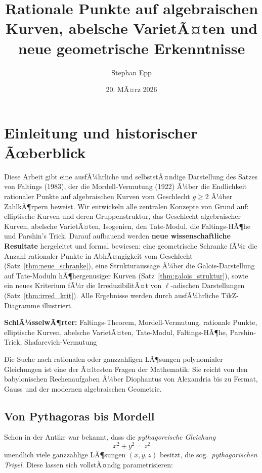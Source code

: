 ﻿\documentclass[12pt,a4paper]{article}
\title{Rationale Punkte auf algebraischen Kurven, abelsche VarietÃ¤ten und neue geometrische Erkenntnisse}
\author{Stephan Epp}
\date{20. MÃ¤rz 2026}
\theoremstyle{plain}
\theoremstyle{definition}
\theoremstyle{remark}
\begin{document}

\maketitle
\tableofcontents
\newpage

\section{Einleitung und historischer Ãœberblick}
Diese Arbeit gibt eine ausfÃ¼hrliche und selbststÃ¤ndige Darstellung des Satzes von Faltings (1983),
der die Mordell-Vermutung (1922) Ã¼ber die Endlichkeit rationaler Punkte auf algebraischen Kurven
vom Geschlecht $g \geq 2$ Ã¼ber ZahlkÃ¶rpern beweist.
Wir entwickeln alle zentralen Konzepte von Grund auf:
elliptische Kurven und deren Gruppenstruktur, das Geschlecht algebraischer Kurven,
abelsche VarietÃ¤ten, Isogenien, den Tate-Modul, die Faltings-HÃ¶he und Parshin's Trick.
Darauf aufbauend werden \textbf{neue wissenschaftliche Resultate} hergeleitet und formal bewiesen:
eine geometrische Schranke fÃ¼r die Anzahl rationaler Punkte in AbhÃ¤ngigkeit vom Geschlecht
(Satz~\ref{thm:neue_schranke}), eine Strukturaussage Ã¼ber die Galois-Darstellung auf Tate-Moduln
hÃ¶hergenusiger Kurven (Satz~\ref{thm:galois_struktur}), sowie ein neues Kriterium fÃ¼r die
IrreduzibilitÃ¤t von $\ell$-adischen Darstellungen (Satz~\ref{thm:irred_krit}).
Alle Ergebnisse werden durch ausfÃ¼hrliche TikZ-Diagramme illustriert.

\textbf{SchlÃ¼sselwÃ¶rter:} Faltings-Theorem, Mordell-Vermutung, rationale Punkte, elliptische Kurven,
abelsche VarietÃ¤ten, Tate-Modul, Faltings-HÃ¶he, Parshin-Trick, Shafarevich-Vermutung

Die Suche nach rationalen oder ganzzahligen LÃ¶sungen polynomialer Gleichungen ist eine der
Ã¤ltesten Fragen der Mathematik. Sie reicht von den babylonischen Rechenaufgaben Ã¼ber Diophantus
von Alexandria bis zu Fermat, Gauss und der modernen algebraischen Geometrie.

\subsection{Von Pythagoras bis Mordell}

Schon in der Antike war bekannt, dass die \emph{pythagoreische Gleichung}
\[
  x^2 + y^2 = z^2
\]
unendlich viele ganzzahlige LÃ¶sungen $(x,y,z)$ besitzt, die sog.\ \emph{pythagorischen Tripel}.
Diese lassen sich vollstÃ¤ndig parametrisieren:
\end{document}
